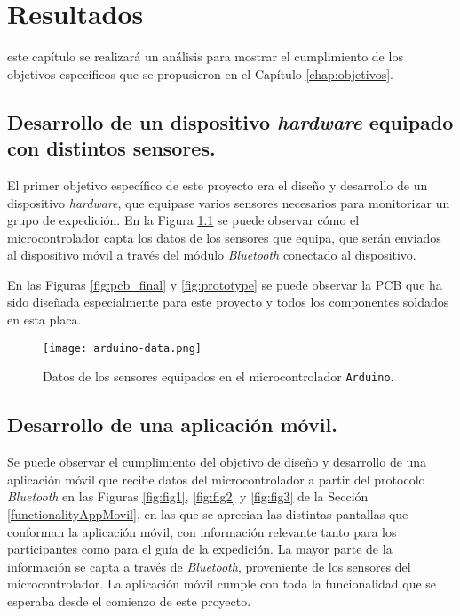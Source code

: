 \chapter{Resultados}
\label{chap:resultados}

 este capítulo se realizará un análisis para mostrar el cumplimiento de los objetivos específicos que se propusieron en el Capítulo \ref{chap:objetivos}.

\section{Desarrollo de un dispositivo \textit{hardware} equipado con distintos sensores.}

El primer objetivo específico de este proyecto era el diseño y desarrollo de un dispositivo \textit{hardware}, que equipase varios sensores necesarios para monitorizar un grupo de expedición. En la Figura \ref{fig:arduino-data} se puede observar cómo el microcontrolador capta los datos de los sensores que equipa, que serán enviados al dispositivo móvil a través del módulo \textit{Bluetooth} conectado al dispositivo.

En las Figuras \ref{fig:pcb_final} y \ref{fig:prototype} se puede observar la \ac{PCB} que ha sido diseñada especialmente para este proyecto y todos los componentes soldados en esta placa.

\begin{figure}[!h]
\begin{center}
\texttt{[image: arduino-data.png]}
\caption{Datos de los sensores equipados en el microcontrolador \texttt{Arduino}.}
\label{fig:arduino-data}
\end{center}
\end{figure}

\section{Desarrollo de una aplicación móvil.}

Se puede observar el cumplimiento del objetivo de diseño y desarrollo de una aplicación móvil que recibe datos del microcontrolador a partir del protocolo \textit{Bluetooth} en las Figuras \ref{fig:fig1}, \ref{fig:fig2} y \ref{fig:fig3} de la Sección \ref{functionalityAppMovil}, en las que se aprecian las distintas pantallas que conforman la aplicación móvil, con información relevante tanto para los participantes como para el guía de la expedición. La mayor parte de la información se capta a través de \textit{Bluetooth}, proveniente de los sensores del microcontrolador. La aplicación móvil cumple con toda la funcionalidad que se esperaba desde el comienzo de este proyecto.

